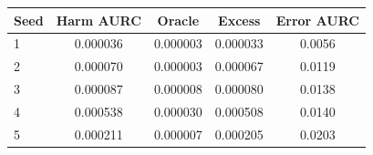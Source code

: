 \footnotesize
\setlength{\tabcolsep}{2.5pt}
\begin{tabular}{lcccc}
\toprule
Seed & Harm AURC & Oracle & Excess & Error AURC \\
\midrule
1 & 0.000036 & 0.000003 & 0.000033 & 0.0056 \\
2 & 0.000070 & 0.000003 & 0.000067 & 0.0119 \\
3 & 0.000087 & 0.000008 & 0.000080 & 0.0138 \\
4 & 0.000538 & 0.000030 & 0.000508 & 0.0140 \\
5 & 0.000211 & 0.000007 & 0.000205 & 0.0203 \\
\bottomrule
\end{tabular}
